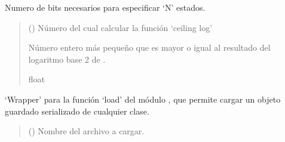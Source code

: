 \documentclass[letterpaper,10pt,english]{sphinxmanual}
\begin{document}
\begin{fulllineitems}
\label{\detokenize{fpga.ring_osc:fpga.ring_osc.clog2}}
\pysigstartsignatures
{}
\pysigstopsignatures
\sphinxAtStartPar
Numero de bits necesarios para especificar ‘N’ estados.
\begin{quote}\begin{description}
\sphinxAtStartPar
{} () \textendash{} Número del cual calcular la función ‘ceiling log’

\sphinxAtStartPar
Número entero más pequeño que es mayor o igual al resultado del logaritmo base 2 de .

\sphinxAtStartPar
float

\end{description}\end{quote}

\end{fulllineitems}


\begin{fulllineitems}
\label{\detokenize{fpga.ring_osc:fpga.ring_osc.load}}
\pysigstartsignatures
{}
\pysigstopsignatures
\sphinxAtStartPar
‘Wrapper’ para la función ‘load’ del módulo , que permite cargar un objeto guardado serializado de cualquier clase.
\begin{quote}\begin{description}
\sphinxAtStartPar
{} () \textendash{} Nombre del archivo a cargar.

\end{description}\end{quote}

\end{fulllineitems}

\end{document}
